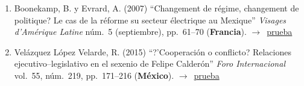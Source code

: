 \documentclass[12 pt, letter]{article}
\newenvironment{CitasMiTrabajo}{
    \begin{footnotesize}
    \begin{enumerate}[label={\footnotesize\emph{cita~\arabic*}},ref=\arabic*] %
        \setlength{\itemsep}{.1\itemsep}
        \setlength{\parskip}{.1\parskip}
    }{\end{enumerate}\end{footnotesize}}
\begin{document}
        \begin{CitasMiTrabajo}

        \item Boonekamp, B. y Evrard, A. (2007)
        ``Changement de r\'egime, changement de politique? Le cas de la r\'eforme su secteur \'electrique au Mexique'' \emph{Visages d'Am\'erique Latine} n\'um.~5 (septiembre), pp.~61--70 (\textbf{Francia}). $\rightarrow$~\href{http://ericmagar.com/cv/cites/magarRomeroFAE/beatrix.pdf}{prueba}

        \item Vel\'azquez L\'opez Velarde, R. (2015)
        ``?'Cooperaci\'on o conflicto? Relaciones ejecutivo--legislativo en el sexenio de Felipe Calder\'on'' \emph{Foro Internacional} vol.~55, n\'um.~219, pp.~171--216 (\textbf{M\'exico}). $\rightarrow$~\href{http://ericmagar.com/cv/cites/magarRomeroFAE/vellovel2015.pdf}{prueba}



        \label{ncites:magar.romero.fae.2007} %

        \end{CitasMiTrabajo}




\end{document}
